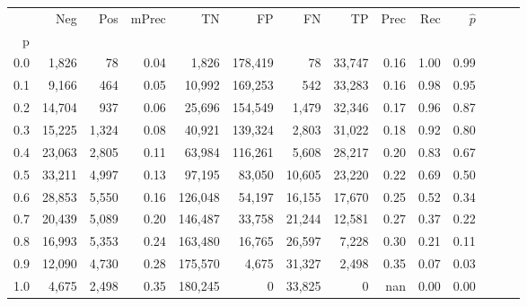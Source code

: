 \begin{tabular}{rrrrrrrrrrrrrr}
\toprule
{} &     Neg &    Pos & mPrec &       TN &       FP &      FN &      TP &  Prec &   Rec & $\hat{p}$ \\
p   &         &        &       &          &          &         &         &       &       &           \\
\midrule
0.0 &   1,826 &     78 &  0.04 &    1,826 &  178,419 &      78 &  33,747 &  0.16 &  1.00 &      0.99 \\
0.1 &   9,166 &    464 &  0.05 &   10,992 &  169,253 &     542 &  33,283 &  0.16 &  0.98 &      0.95 \\
0.2 &  14,704 &    937 &  0.06 &   25,696 &  154,549 &   1,479 &  32,346 &  0.17 &  0.96 &      0.87 \\
0.3 &  15,225 &  1,324 &  0.08 &   40,921 &  139,324 &   2,803 &  31,022 &  0.18 &  0.92 &      0.80 \\
0.4 &  23,063 &  2,805 &  0.11 &   63,984 &  116,261 &   5,608 &  28,217 &  0.20 &  0.83 &      0.67 \\
0.5 &  33,211 &  4,997 &  0.13 &   97,195 &   83,050 &  10,605 &  23,220 &  0.22 &  0.69 &      0.50 \\
0.6 &  28,853 &  5,550 &  0.16 &  126,048 &   54,197 &  16,155 &  17,670 &  0.25 &  0.52 &      0.34 \\
0.7 &  20,439 &  5,089 &  0.20 &  146,487 &   33,758 &  21,244 &  12,581 &  0.27 &  0.37 &      0.22 \\
0.8 &  16,993 &  5,353 &  0.24 &  163,480 &   16,765 &  26,597 &   7,228 &  0.30 &  0.21 &      0.11 \\
0.9 &  12,090 &  4,730 &  0.28 &  175,570 &    4,675 &  31,327 &   2,498 &  0.35 &  0.07 &      0.03 \\
1.0 &   4,675 &  2,498 &  0.35 &  180,245 &        0 &  33,825 &       0 &   nan &  0.00 &      0.00 \\
\bottomrule
\end{tabular}
